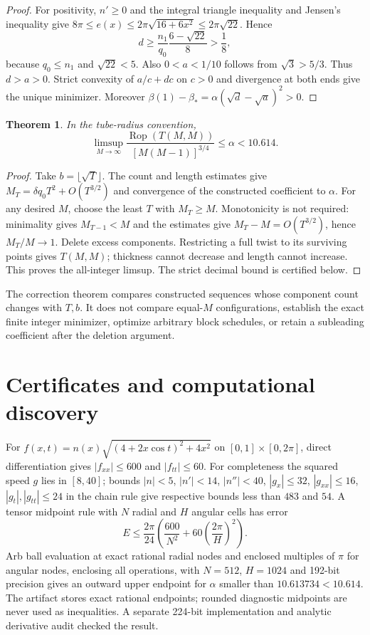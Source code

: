 \documentclass[11pt]{article}
\newtheorem{theorem}{Theorem}
\newcommand{\Rop}{\operatorname{Rop}}
\begin{document}
\begin{proof}
For positivity, $n'\ge0$ and the integral triangle inequality and Jensen's
inequality give $8\pi\le e(x)\le2\pi\sqrt{16+6x^2}\le2\pi\sqrt{22}$.
Hence
\[
d\ge\frac{n_1}{q_0}\frac{6-\sqrt{22}}8>\frac18,
\]
because $q_0\le n_1$ and $\sqrt{22}<5$. Also $0<a<1/10$ follows from
$\sqrt3>5/3$. Thus $d>a>0$. Strict convexity of $a/c+dc$ on $c>0$
and divergence at both ends give the unique minimizer. Moreover
$\beta(1)-\beta_* =\alpha(\sqrt d-\sqrt a)^2>0$.
\end{proof}

\begin{theorem}\label{upper}
In the tube-radius convention,
\[
\limsup_{M\to\infty}\frac{\Rop(T(M,M))}{[M(M-1)]^{3/4}}
\le\alpha<10.614.
\]
\end{theorem}
\begin{proof}
Take $b=\lfloor\sqrt T\rfloor$. The count and length estimates give
$M_T=\delta q_0T^2+O(T^{3/2})$ and convergence of the constructed coefficient
to $\alpha$. For any desired $M$, choose the least $T$ with $M_T\ge M$.
Monotonicity is not required: minimality gives $M_{T-1}<M$ and the estimates
give $M_T-M=O(T^{3/2})$, hence $M_T/M\to1$. Delete excess components.
Restricting a full twist to its surviving points gives $T(M,M)$;
thickness cannot decrease and length cannot increase. This proves the
all-integer limsup. The strict decimal bound is certified below.
\end{proof}

The correction theorem compares constructed sequences whose component count
changes with $T,b$. It does not compare equal-$M$ configurations, establish
the exact finite integer minimizer, optimize arbitrary block schedules, or
retain a subleading coefficient after the deletion argument.

\section{Certificates and computational discovery}
For $f(x,t)=n(x)\sqrt{(4+2x\cos t)^2+4x^2}$ on
$[0,1]\times[0,2\pi]$, direct differentiation gives
$|f_{xx}|\le600$ and $|f_{tt}|\le60$. For completeness the squared speed
$g$ lies in $[8,40]$; bounds
$|n|<5$, $|n'|<14$, $|n''|<40$,
$|g_x|\le32$, $|g_{xx}|\le16$, $|g_t|,|g_{tt}|\le24$
in the chain rule give respective bounds less than $483$ and $54$.
A tensor midpoint rule with $N$ radial and $H$ angular cells has error
\[
E\le\frac{2\pi}{24}\left(\frac{600}{N^2}
 +60\left(\frac{2\pi}{H}\right)^2\right).
\]
Arb ball evaluation at exact rational radial nodes and enclosed multiples of
$\pi$ for angular nodes, enclosing all
operations, with $N=512$, $H=1024$ and 192-bit precision gives an outward
upper endpoint for $\alpha$ smaller than $10.613734<10.614$.
The artifact stores exact rational endpoints; rounded diagnostic midpoints
are never used as inequalities. A separate 224-bit implementation and
analytic derivative audit checked the result.
\end{document}
